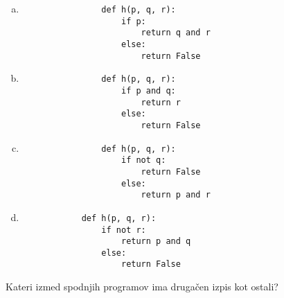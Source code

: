 \documentclass[arhiv, 10pt]{../izpit}
\begin{document}
        \begin{multicols}{2}
        \begin{enumerate}[(a)]
\item 
                \begin{verbatim}
                def h(p, q, r):
                    if p:
                        return q and r
                    else:
                        return False
                \end{verbatim}
            
\item 
                \begin{verbatim}
                def h(p, q, r):
                    if p and q:
                        return r
                    else:
                        return False
                \end{verbatim}
            
\item 
                \begin{verbatim}
                def h(p, q, r):
                    if not q:
                        return False
                    else:
                        return p and r
                \end{verbatim}
            
\item 
            \begin{verbatim}
            def h(p, q, r):
                if not r:
                    return p and q
                else:
                    return False
            \end{verbatim}
        
\end{enumerate}

        \end{multicols}
    
        \naloga*
        
        Kateri izmed spodnjih programov ima drugačen izpis kot ostali?
    
\end{document}

